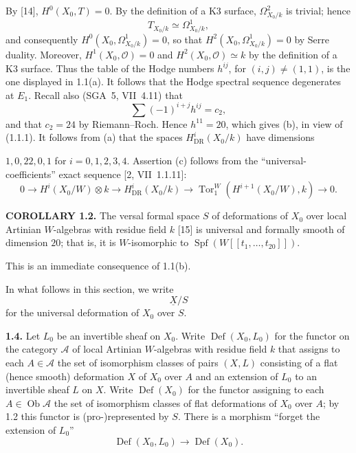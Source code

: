 \documentclass[10pt]{article}
\newcommand{\UX}{\underline{X}}
\begin{document}
By [14], $H^0(X_0,T)=0$. By the definition of a K3 surface, $\Omega^2_{X_0/k}$ is trivial; hence
\begin{equation}\tag{1.1.1}
T_{X_0/k}\simeq\Omega^1_{X_0/k},
\end{equation}
and consequently $H^0(X_0,\Omega^1_{X_0/k})=0$, so that $H^2(X_0,\Omega^1_{X_0/k})=0$ by Serre duality. Moreover, $H^1(X_0,\mathcal O)=0$ and $H^2(X_0,\mathcal O)\simeq k$ by the definition of a K3 surface. Thus the table of the Hodge numbers $h^{ij}$, for $(i,j)\ne(1,1)$, is the one displayed in 1.1(a). It follows that the Hodge spectral sequence degenerates at $E_1$. Recall also (SGA~5, VII~4.11) that
\[
\sum(-1)^{i+j}h^{ij}=c_2,
\]
and that $c_2=24$ by Riemann--Roch. Hence $h^{11}=20$, which gives (b), in view of (1.1.1). It follows from (a) that the spaces $H^i_{\mathrm{DR}}(X_0/k)$ have dimensions
\newpage
\setcounter{footnote}{0}
\fontsize{10.2pt}{12.04pt}\selectfont

$1,0,22,0,1$ for $i=0,1,2,3,4$. Assertion (c) follows from the ``universal-coefficients'' exact sequence [2, VII~1.1.11]:
\[
0\longrightarrow H^i(X_0/W)\otimes k\longrightarrow H^i_{\mathrm{DR}}(X_0/k)
\longrightarrow \operatorname{Tor}^W_1(H^{i+1}(X_0/W),k)\longrightarrow0.
\]

\noindent\textbf{COROLLARY 1.2.} The versal formal space $S$ of deformations of $X_0$ over local Artinian $W$-algebras with residue field $k$ [15] is universal and formally smooth of dimension $20$; that is, it is $W$-isomorphic to $\operatorname{Spf}(W[[t_1,\ldots,t_{20}]])$.

This is an immediate consequence of 1.1(b).

In what follows in this section, we write
\begin{equation}\tag{1.3}
\UX/S
\end{equation}
for the universal deformation of $X_0$ over $S$.

\noindent\textbf{1.4.} Let $L_0$ be an invertible sheaf on $X_0$. Write $\operatorname{Def}(X_0,L_0)$ for the functor on the category $\mathcal A$ of local Artinian $W$-algebras with residue field $k$ that assigns to each $A\in\mathcal A$ the set of isomorphism classes of pairs $(X,L)$ consisting of a flat (hence smooth) deformation $X$ of $X_0$ over $A$ and an extension of $L_0$ to an invertible sheaf $L$ on $X$. Write $\operatorname{Def}(X_0)$ for the functor assigning to each $A\in\operatorname{Ob}\mathcal A$ the set of isomorphism classes of flat deformations of $X_0$ over $A$; by 1.2 this functor is (pro-)represented by $S$. There is a morphism ``forget the extension of $L_0$''
\begin{equation}\tag{1.4.1}
\operatorname{Def}(X_0,L_0)\longrightarrow\operatorname{Def}(X_0).
\end{equation}
\end{document}
